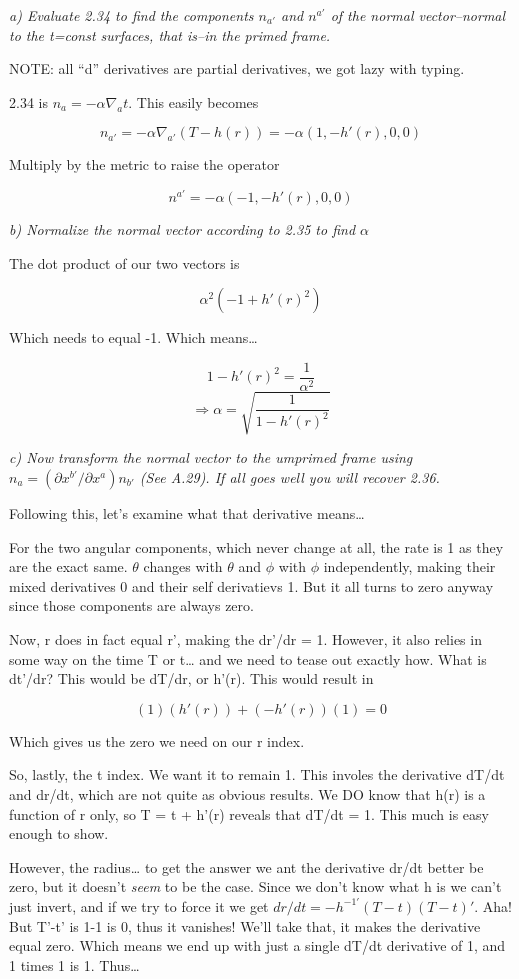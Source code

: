 \documentclass[landscape,letterpaper,10pt,english]{article}
\begin{document}
\emph{a) Evaluate 2.34 to find the components \(n_{a'}\) and \(n^{a'}\)
of the normal vector--normal to the t=const surfaces, that is--in the
primed frame.}

    NOTE: all ``d'' derivatives are partial derivatives, we got lazy with
typing.

2.34 is \(n_a = -\alpha \nabla_a t\). This easily becomes

\[ n_{a'} = -\alpha \nabla_{a'} (T-h(r)) = -\alpha(1,-h'(r),0,0)\]

Multiply by the metric to raise the operator

\[ n^{a'} = -\alpha(-1,-h'(r),0,0)\]

    \emph{b) Normalize the normal vector according to 2.35 to find
\(\alpha\)}

The dot product of our two vectors is

\[ \alpha^2 (-1 + h'(r)^2) \]

Which needs to equal -1. Which means\ldots{}

\[ 1-h'(r)^2 = \frac{1}{\alpha^2} \]
\[ \Rightarrow \alpha = \sqrt{\frac{1}{1-h'(r)^2}} \]

    \emph{c) Now transform the normal vector to the umprimed frame using
\(n_a = (\partial x^{b'} / \partial x^a)n_{b'}\) (See A.29). If all goes
well you will recover 2.36.}

    Following this, let's examine what that derivative means\ldots{}

For the two angular components, which never change at all, the rate is 1
as they are the exact same. \(\theta\) changes with \(\theta\) and
\(\phi\) with \(\phi\) independently, making their mixed derivatives 0
and their self derivatievs 1. But it all turns to zero anyway since
those components are always zero.

Now, r does in fact equal r', making the dr'/dr = 1. However, it also
relies in some way on the time T or t\ldots{} and we need to tease out
exactly how. What is dt'/dr? This would be dT/dr, or h'(r). This would
result in

\[ (1)(h'(r)) + (-h'(r))(1) = 0 \]

Which gives us the zero we need on our r index.

So, lastly, the t index. We want it to remain 1. This involes the
derivative dT/dt and dr/dt, which are not quite as obvious results. We
DO know that h(r) is a function of r only, so T = t + h'(r) reveals that
dT/dt = 1. This much is easy enough to show.

However, the radius\ldots{} to get the answer we ant the derivative
dr/dt better be zero, but it doesn't \emph{seem} to be the case. Since
we don't know what h is we can't just invert, and if we try to force it
we get \(dr/dt = -h^{-1'}(T-t)(T-t)'\). Aha! But T'-t' is 1-1 is 0, thus
it vanishes! We'll take that, it makes the derivative equal zero. Which
means we end up with just a single dT/dt derivative of 1, and 1 times 1
is 1. Thus\ldots{}
\end{document}
